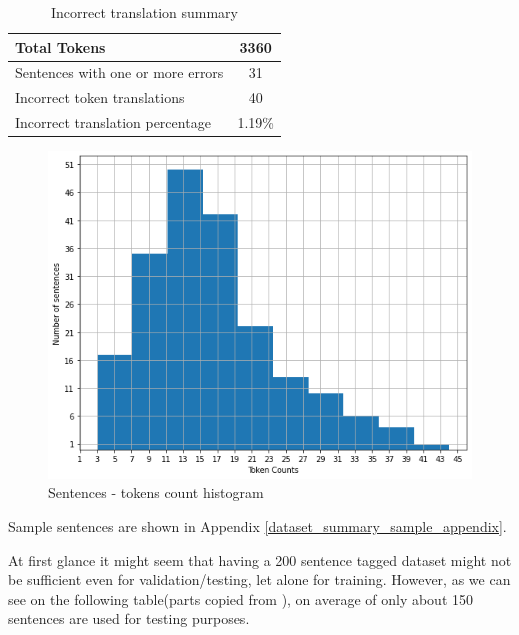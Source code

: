 \begin{table}
    \begin{center}
        \begin{tabular}{|l|c|}
            \hline
            Total Tokens & 3360 \\
            \hline
            Sentences with one or more errors & 31 \\
            \hline
            Incorrect token translations & 40 \\
            \hline
            Incorrect translation percentage & 1.19\% \\
            \hline
        \end{tabular}
        \caption{Incorrect translation summary}
        \label{table:incorrect_summary}
    \end{center}
\end{table}

\begin{figure}[!h]
    \center
    \includegraphics[scale=0.5]{images/dataset_histogram}
    \caption{Sentences - tokens count histogram}
    \label{tokens_count_histogram}
\end{figure}
Sample sentences are shown in Appendix \ref{dataset_summary_sample_appendix}.
\newpage

At first glance it might seem that having a 200 sentence tagged dataset might
not be sufficient even for validation/testing, let alone for training. However,
as we can see on the following table(parts copied from \cite{udapter}), on
average of only about 150 sentences are used for testing purposes.

